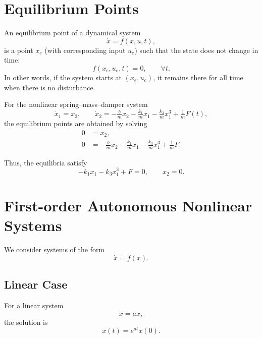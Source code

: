 \section{Equilibrium Points}

\begin{definition}
An equilibrium point of a dynamical system
\begin{equation}
    \dot{x} = f(x,u,t),
\end{equation}
is a point $x_e$ (with corresponding input $u_e$) such that the state does not change in time:
\begin{equation}
    f(x_e,u_e,t) = 0, \qquad \forall t.
\end{equation}
In other words, if the system starts at $(x_e,u_e)$, it remains there for all time when there is no disturbance.
\end{definition}

\begin{example}
For the nonlinear spring–mass–damper system
\begin{equation}
    \dot{x}_1 = x_2, \qquad 
    \dot{x}_2 = -\tfrac{b}{m}x_2 - \tfrac{k_1}{m}x_1 - \tfrac{k_3}{m}x_1^3 + \tfrac{1}{m}F(t),
\end{equation}
the equilibrium points are obtained by solving
\begin{align}
    0 &= x_2, \\
    0 &= -\tfrac{b}{m}x_2 - \tfrac{k_1}{m}x_1 - \tfrac{k_3}{m}x_1^3 + \tfrac{1}{m}F.
\end{align}

Thus, the equilibria satisfy
\begin{equation}
    -k_1 x_1 - k_3 x_1^3 + F = 0, \qquad x_2 = 0.
\end{equation}

\end{example}

\section{First-order Autonomous Nonlinear Systems}

We consider systems of the form
\begin{equation}
    \dot{x} = f(x).
\end{equation}

\subsection{Linear Case}
For a linear system
\begin{equation}
    \dot{x} = a x,
\end{equation}
the solution is
\begin{equation}
    x(t) = e^{at} x(0).
\end{equation}

